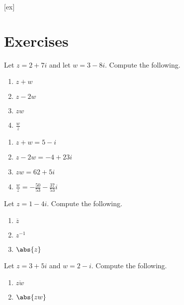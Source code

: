[ex]
\section*{Exercises}

\begin{enumialphparenastyle}

\begin{ex} Let $z=2+7i$ and let $w=3-8i$. Compute the following.

\begin{enumerate}
\item $z + w$

\item $z - 2w$

\item $zw$

\item $\frac{w}{z}$
\end{enumerate}
\begin{sol}
\begin{enumerate}
\item $z + w = 5-i$
\item $z - 2w = -4 + 23i$
\item $zw = 62+5i$ 
\item $\frac{w}{z} = -\frac{50}{53}-\frac{37}{53}i$
\end{enumerate}
\end{sol}
\end{ex}

\begin{ex} Let $z = 1 - 4i$. Compute the following.

\begin{enumerate}

\item $\overline{z}$

\item $z^{-1}$

\item $\abs{z}$
\end{enumerate}
\end{ex}

\begin{ex} Let $z = 3 +5i$ and $w = 2 - i$. Compute the following.

\begin{enumerate}
\item $\overline{zw}$

\item $\abs{zw}$


\end{enumerate}
\end{ex}
\end{enumialphparenastyle}

